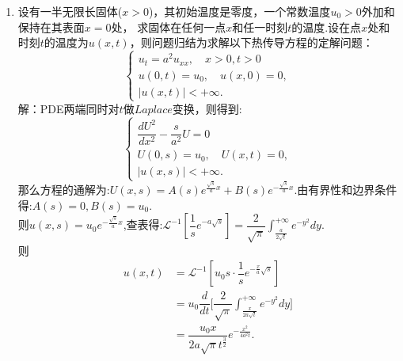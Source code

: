 \documentclass[11pt]{article}
\begin{document}
\begin{enumerate}
    \item 设有一半无限长固体($x>0$)，其初始温度是零度，一个常数温度$u_0>0$外加和保持在其表面$x=0$处， 求固体在任何一点$x$和任一时刻$t$的温度.设在点$x$处和时刻$t$的温度为$u(x,t)$，则问题归结为求解以下热传导方程的定解问题：
       \begin{equation*}
    \left\{
     \begin{array}{lr}
     u_{t}=a^2u_{xx},\quad x > 0, t>0\\u(0,t)=u_0,\quad u(x,0)=0,\\|u(x,t)|<+\infty.
     \end{array}
    \right.
    \end{equation*}
        解：PDE两端同时对$t$做$Laplace$变换，则得到:
    \begin{equation*}
        \left\{
         \begin{array}{lr}
         \dfrac{dU^2}{dx^2}-\dfrac{s}{a^2}U=0\\U(0,s) = u_0,\quad U(x,t)=0,\\|u(x,s)|<+\infty.
         \end{array}
        \right.
     \end{equation*}
    那么方程的通解为:$U(x,s)=A(s)e^{\frac{\sqrt {s}}{a}x}+B(s)e^{-\frac{\sqrt {s}}{a}x}$.由有界性和边界条件得:$A(s)=0,B(s)=u_0$.\\则$u(x,s)=u_0 e^{-\frac{\sqrt {s}}{a}x} $,查表得:$\mathscr{L}^{-1}[\dfrac{1}{s}e^{-a\sqrt {s}}]=\dfrac{2}{\sqrt {\pi}}\displaystyle\int_{\frac{a}{2\sqrt {t}}}^{+\infty}e^{-y^2}dy$.\\
    则\begin{align*}
    u(x,t) &= \mathscr{L}^{-1}[u_0 s\cdot \dfrac{1}{s}e^{-\frac{x}{a}\sqrt {s}}]\\
    &= u_0 \dfrac{d}{dt}\big[\dfrac{2}{\sqrt {\pi}}\displaystyle\int_{\frac{x}{2a\sqrt {t}}}^{+\infty}e^{-y^2}dy\big]\\[8pt]
    &= \dfrac{u_0 x}{2a\sqrt {\pi}t^{\frac{3}{2}}}e^{-\frac{x^2}{4a^2 t}}.
    \end{align*}



\end{enumerate}
\end{document}
